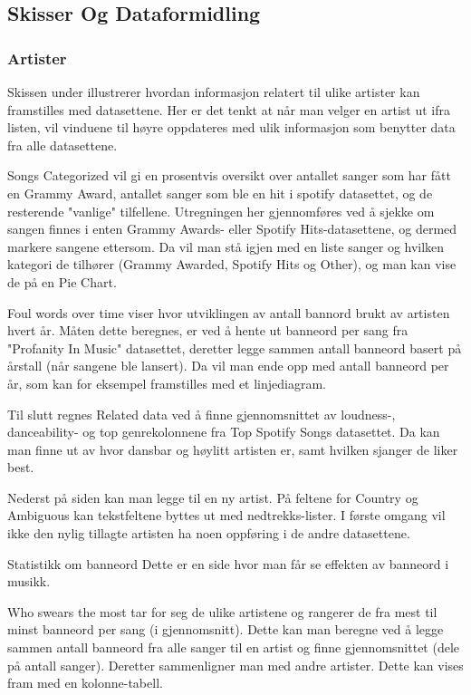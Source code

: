\subsection{Skisser Og Dataformidling}
\subsubsection{Artister}
Skissen under illustrerer hvordan informasjon relatert til ulike artister kan framstilles med datasettene. Her er det tenkt at når man velger en artist ut ifra listen, vil vinduene til høyre oppdateres med ulik informasjon som benytter data fra alle datasettene.

Songs Categorized vil gi en prosentvis oversikt over antallet sanger som har fått en Grammy Award, antallet sanger som ble en hit i spotify datasettet, og de resterende "vanlige" tilfellene. Utregningen her gjennomføres ved å sjekke om sangen finnes i enten Grammy Awards- eller Spotify Hits-datasettene, og dermed markere sangene ettersom. Da vil man stå igjen med en liste sanger og hvilken kategori de tilhører (Grammy Awarded, Spotify Hits og Other), og man kan vise de på en Pie Chart.

Foul words over time viser hvor utviklingen av antall bannord brukt av artisten hvert år. Måten dette beregnes, er ved å hente ut banneord per sang fra "Profanity In Music" datasettet, deretter legge sammen antall banneord basert på årstall (når sangene ble lansert). Da vil man ende opp med antall banneord per år, som kan for eksempel framstilles med et linjediagram.

Til slutt regnes Related data ved å finne gjennomsnittet av loudness-, danceability- og top genrekolonnene fra Top Spotify Songs datasettet. Da kan man finne ut av hvor dansbar og høylitt artisten er, samt hvilken sjanger de liker best.

Nederst på siden kan man legge til en ny artist. På feltene for Country og Ambiguous kan tekstfeltene byttes ut med nedtrekks-lister. I første omgang vil ikke den nylig tillagte artisten ha noen oppføring i de andre datasettene.

Statistikk om banneord
Dette er en side hvor man får se effekten av banneord i musikk.

Who swears the most tar for seg de ulike artistene og rangerer de fra mest til minst banneord per sang (i gjennomsnitt). Dette kan man beregne ved å legge sammen antall banneord fra alle sanger til en artist og finne gjennomsnittet (dele på antall sanger). Deretter sammenligner man med andre artister. Dette kan vises fram med en kolonne-tabell.

